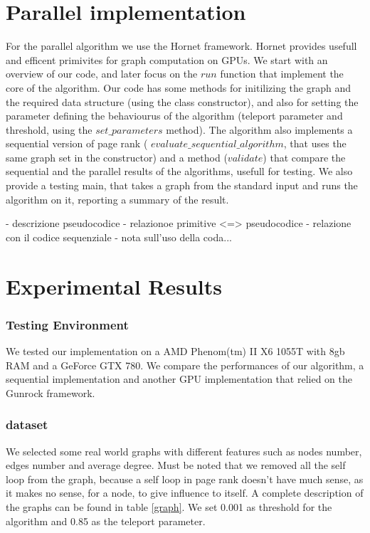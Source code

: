 \documentclass[journal]{IEEEtran}
\begin{document}
\section{Parallel implementation} 
For the parallel algorithm we use the Hornet framework. Hornet provides
usefull and efficent primivites for graph computation on GPUs.
We start with an overview of our code, and later focus on the ${run}$ function
that implement the core of the algorithm.
Our code has some methods for initilizing the graph and the required data
structure (using the class constructor), and also for setting the parameter
defining the behaviourus of the algorithm (teleport parameter and threshold,
using the ${set\_parameters}$ method).
The algorithm also implements a sequential version of page rank (
${evaluate\_sequential\_algorithm}$, that uses the same graph set in the constructor)
and a method (${validate}$) that compare the sequential and the parallel
results of the algorithms, usefull for testing.
We also provide a testing main, that takes a graph from the standard input
and runs the algorithm on it, reporting a summary of the result.




- descrizione pseudocodice
- relazionoe primitive <=> pseudocodice
- relazione con il codice sequenziale
- nota sull'uso della coda... 

\section{Experimental Results} 
\subsubsection{Testing Environment}
We tested our implementation on a AMD Phenom(tm) II X6 1055T with 8gb RAM and 
a GeForce GTX 780.
We compare the performances of our algorithm, a sequential implementation and
another GPU implementation that relied on the Gunrock framework.
\subsubsection{dataset}
We selected some real world graphs with different features such as
nodes number, edges number and average degree.
Must be noted that we removed all the self loop from the graph, because a self
loop in page rank doesn't have much sense, as it makes no sense, for a node,
to give influence to itself.
A complete description of the graphs can be found in table \ref{graph}.
We set 0.001 as threshold for the algorithm and 0.85 as the teleport parameter.
\end{document}
